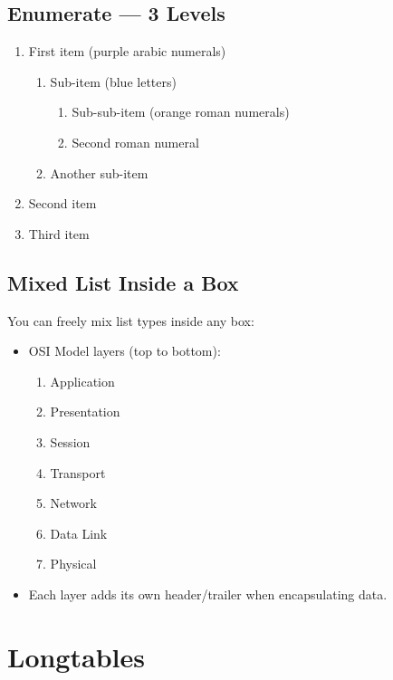 \documentclass[main.tex]{subfiles}
\begin{document}
\subsection{Enumerate — 3 Levels}

\begin{enumerate}
    \item First item (purple arabic numerals)
    \begin{enumerate}
        \item Sub-item (blue letters)
        \begin{enumerate}
            \item Sub-sub-item (orange roman numerals)
            \item Second roman numeral
        \end{enumerate}
        \item Another sub-item
    \end{enumerate}
    \item Second item
    \item Third item
\end{enumerate}

\subsection{Mixed List Inside a Box}

\begin{infobox}
You can freely mix list types inside any box:
\begin{itemize}
    \item OSI Model layers (top to bottom):
    \begin{enumerate}
        \item Application
        \item Presentation
        \item Session
        \item Transport
        \item Network
        \item Data Link
        \item Physical
    \end{enumerate}
    \item Each layer adds its own header/trailer when encapsulating data.
\end{itemize}
\end{infobox}

\section{Longtables}
\end{document}
